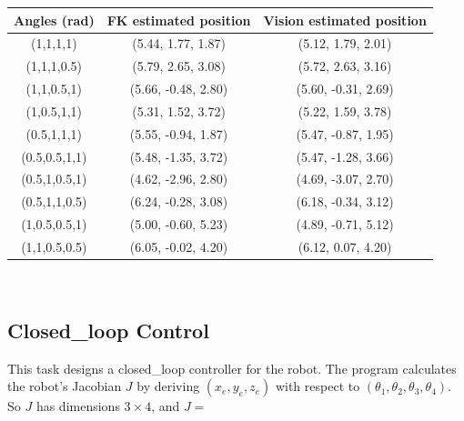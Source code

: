 \documentclass{article}
\begin{document}
\begin{center}
\begin{tabular}{c|c|c}
     Angles (rad) & FK estimated position & Vision estimated position \\ \hline
     (1,1,1,1) & (5.44, 1.77, 1.87) & (5.12, 1.79, 2.01) \\
     (1,1,1,0.5) & (5.79, 2.65, 3.08) & (5.72, 2.63, 3.16) \\
     (1,1,0.5,1) & (5.66, -0.48, 2.80) & (5.60, -0.31, 2.69) \\ 
     (1,0.5,1,1) & (5.31, 1.52, 3.72) & (5.22, 1.59, 3.78) \\ 
     (0.5,1,1,1) & (5.55, -0.94, 1.87) & (5.47, -0.87, 1.95) \\
     (0.5,0.5,1,1) & (5.48, -1.35, 3.72) & (5.47, -1.28, 3.66) \\
     (0.5,1,0.5,1) & (4.62, -2.96, 2.80) & (4.69, -3.07, 2.70) \\ 
     (0.5,1,1,0.5) & (6.24, -0.28, 3.08) & (6.18, -0.34, 3.12) \\
     (1,0.5,0.5,1) & (5.00, -0.60, 5.23) & (4.89, -0.71, 5.12) \\
     (1,1,0.5,0.5) & (6.05, -0.02, 4.20) & (6.12, 0.07, 4.20) \\
\end{tabular} \\
\end{center}


\subsection{Closed\_loop Control}
This task designs a closed\_loop controller for the robot. The program calculates the robot's Jacobian $J$ by deriving $(x_e, y_e, z_e)$ with respect to $(\theta_1, \theta_2, \theta_3, \theta_4)$. So $J$ has dimensions $3\times4$, and $J =$
\end{document}
